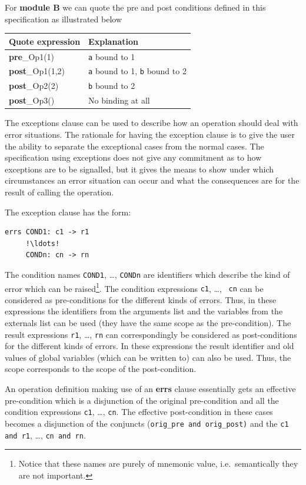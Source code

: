 \documentclass{overturerepchap}
\newcommand{\keyw}[1]{{\bf\ttfamily #1}}
\begin{document}
\begin{description}
For \textbf{module B} we can quote the pre and post conditions defined
in this specification as illustrated below

\begin{tabular}{|p{}|p{}|} \hline
\textrm{Quote expression} & Explanation \\ \hline
\keyw{pre}\_Op1(1)     & \texttt{a} bound to 1 \\
\keyw{post}\_Op1(1,2)  & \texttt{a} bound to 1, \texttt{b} bound to 2\\
\keyw{post}\_Op2(2)    & \texttt{b} bound to 2\\
\keyw{post}\_Op3()     & No binding at all\\
\hline
\end{tabular}

\vspace{2ex}


The exceptions clause can be used to describe how an operation should
deal with error situations. The rationale for having the exception
clause is to give the user the ability to separate the exceptional
cases from the normal cases. The specification using exceptions does
not give any commitment as to how exceptions are to be signalled, but
it gives the means to show under which circumstances an error
situation can occur and what the consequences are for the result of
calling the operation.

The exception clause has the form:
\begin{lstlisting}
errs COND1: c1 -> r1
     !\ldots!
     CONDn: cn -> rn
\end{lstlisting}
The condition names {\tt COND1}, \ldots, {\tt CONDn} are identifiers
which describe the kind of error which can be raised\footnote{Notice
that these names are purely of mnemonic value, i.e.\ semantically they
are not important.}. The condition expressions {\tt c1}, \ldots, {\tt
cn} can be considered as pre-conditions for the different kinds of
errors. Thus, in these expressions the identifiers from the arguments
list and the variables from the externals list can be used (they have
the same scope as the pre-condition). The result expressions {\tt r1},
\ldots, {\tt rn} can correspondingly be considered as post-conditions
for the different kinds of errors. In these expressions the result
identifier and old values of global variables (which can be written
to) can also be used. Thus, the scope corresponds to the scope of the
post-condition.

An operation definition making use of an \keyw{errs} clause 
essentially gets an effective pre-condition which is a disjunction of
the original pre-condition and all the condition expressions {\tt c1},
\ldots, {\tt cn}. The effective post-condition in these cases becomes
a disjunction of the conjuncts ({\tt orig\_pre and orig\_post)} and
the {\tt c1 and r1}, \ldots, {\tt cn and rn}.


\end{description}
\end{document}

